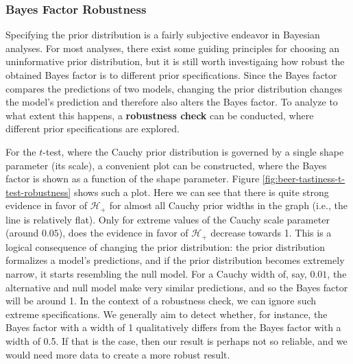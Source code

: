 \documentclass[
]{book}
\begin{document}
\hypertarget{bayes-factor-robustness}{%
\subsubsection{Bayes Factor Robustness}\label{bayes-factor-robustness}}

Specifying the prior distribution is a fairly subjective endeavor in Bayesian analyses. For most analyses, there exist some guiding principles for choosing an uninformative prior distribution, but it is still worth investigaing how robust the obtained Bayes factor is to different prior specifications. Since the Bayes factor compares the predictions of two models, changing the prior distribution changes the model's prediction and therefore also alters the Bayes factor. To analyze to what extent this happens, a \textbf{robustness check} can be conducted, where different prior specifications are explored.

For the \(t\)-test, where the Cauchy prior distribution is governed by a single shape parameter (its scale), a convenient plot can be constructed, where the Bayes factor is shown as a function of the shape parameter. Figure \ref{fig:beer-tastiness-t-test-robustness} shows such a plot. Here we can see that there is quite strong evidence in favor of \(\mathcal{H}_{+}\) for almost all Cauchy prior widths in the graph (i.e., the line is relatively flat). Only for extreme values of the Cauchy scale parameter (around \(0.05\)), does the evidence in favor of \(\mathcal{H}_{+}\) decrease towards 1. This is a logical consequence of changing the prior distribution: the prior distribution formalizes a model's predictions, and if the prior distribution becomes extremely narrow, it starts resembling the null model. For a Cauchy width of, say, \(0.01\), the alternative and null model make very similar predictions, and so the Bayes factor will be around 1. In the context of a robustness check, we can ignore such extreme specifications. We generally aim to detect whether, for instance, the Bayes factor with a width of 1 qualitatively differs from the Bayes factor with a width of 0.5. If that is the case, then our result is perhaps not so reliable, and we would need more data to create a more robust result.
\end{document}
